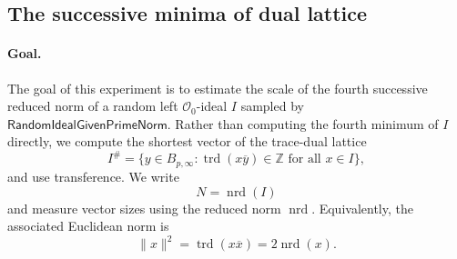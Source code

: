 

\subsection{The successive minima of dual lattice}
\label{subsec:exp-dual}

\paragraph{Goal.}
The goal of this experiment is to estimate the scale of the fourth
successive reduced norm of a random left \(\mathcal O_0\)-ideal \(I\)
sampled by \(\mathsf{RandomIdealGivenPrimeNorm}\).  Rather than computing
the fourth minimum of \(I\) directly, we compute the shortest vector of the
trace-dual lattice
\[
I^\#
=
\{y\in B_{p,\infty}:\operatorname{trd}(x\overline y)\in \mathbb Z
\text{ for all }x\in I\},
\]
and use transference.  We write
\[
N=\operatorname{nrd}(I)
\]
and measure vector sizes using the reduced norm \(\operatorname{nrd}\).
Equivalently, the associated Euclidean norm is
\[
\|x\|^2=\operatorname{trd}(x\overline x)=2\operatorname{nrd}(x).
\]

